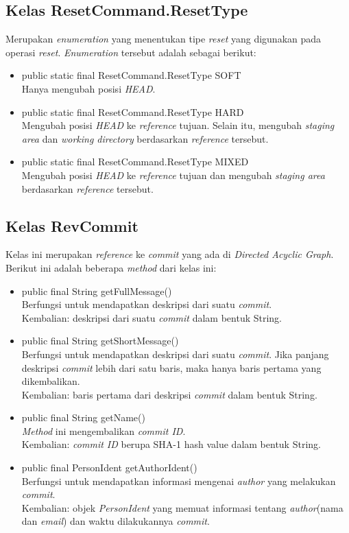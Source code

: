 \subsection{Kelas ResetCommand.ResetType}
\label{subsec:resettype}
Merupakan \textit{enumeration} yang menentukan tipe \textit{reset} yang digunakan pada operasi \textit{reset}.
\textit{Enumeration} tersebut adalah sebagai berikut:
\begin{itemize}
\item public static final ResetCommand.ResetType SOFT\\
Hanya mengubah posisi \textit{HEAD}. 
\item public static final ResetCommand.ResetType HARD\\
Mengubah posisi \textit{HEAD} ke \textit{reference} tujuan. Selain itu, mengubah \textit{staging area} dan \textit{working directory} berdasarkan \textit{reference} tersebut.
\item public static final ResetCommand.ResetType MIXED\\
Mengubah posisi \textit{HEAD} ke \textit{reference} tujuan dan mengubah \textit{staging area} berdasarkan \textit{reference} tersebut.
\end{itemize}

\subsection{Kelas RevCommit}
\label{subsec:revcommit}
Kelas ini merupakan \textit{reference} ke \textit{commit} yang ada di \textit{Directed Acyclic Graph}. Berikut ini adalah  beberapa \textit{method} dari kelas ini:
\begin{itemize}
\item public final String getFullMessage()\\
Berfungsi untuk mendapatkan deskripsi dari suatu \textit{commit}.\\
Kembalian: deskripsi dari suatu \textit{commit} dalam bentuk String.

\item public final String getShortMessage()\\
Berfungsi untuk mendapatkan deskripsi dari suatu \textit{commit}. Jika panjang deskripsi \textit{commit} lebih dari satu baris, maka hanya baris pertama yang dikembalikan.\\
Kembalian: baris pertama dari deskripsi \textit{commit} dalam bentuk String.

\item public final String getName()\\
\textit{Method} ini mengembalikan \textit{commit ID}.\\
Kembalian: \textit{commit ID} berupa SHA-1 hash value dalam bentuk String. 

\item public final PersonIdent getAuthorIdent()\\
Berfungsi untuk mendapatkan informasi mengenai \textit{author} yang melakukan \textit{commit}.\\
Kembalian: objek \textit{PersonIdent} yang memuat informasi tentang \textit{author}(nama dan \textit{email}) dan waktu dilakukannya \textit{commit}.
\end{itemize}

